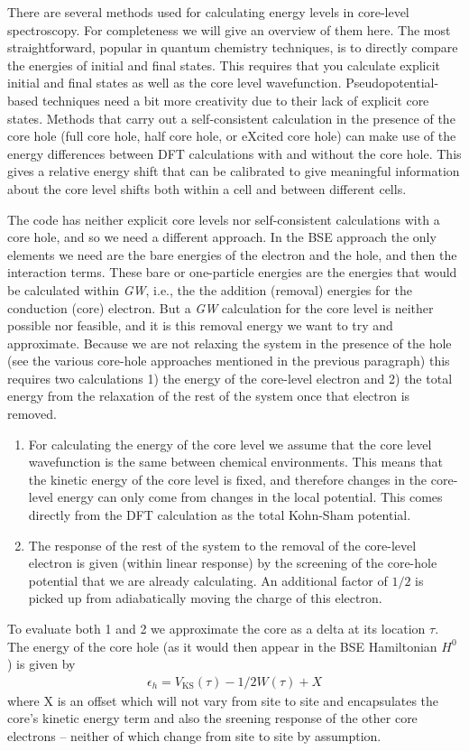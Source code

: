 \documentclass[11pt]{report}
\begin{document}
There are several methods used for calculating energy levels in core-level spectroscopy. For completeness we will give an overview of them here. The most straightforward, popular in quantum chemistry techniques, is to directly compare the energies of initial and final states. This requires that you calculate explicit initial and final states as well as the core level wavefunction. Pseudopotential-based techniques need a bit more creativity due to their lack of explicit core states. Methods that carry out a self-consistent calculation in the presence of the core hole (full core hole, half core hole, or eXcited core hole) can make use of the energy differences between DFT calculations with and without the core hole. This gives a relative energy shift that can be calibrated to give meaningful information about the core level shifts both within a cell and between different cells.\cite{NeedCites}

The  code has neither explicit core levels nor self-consistent calculations with a core hole, and so we need a different approach. In the BSE approach the only elements we need are the bare energies of the electron and the hole, and then the interaction terms. These bare or one-particle energies are the energies that would be calculated within {\it GW}, i.e., the the addition (removal) energies for the conduction (core) electron. But a {\it GW} calculation for the core level is neither possible nor feasible, and it is this removal energy we want to try and approximate. Because we are not relaxing the system in the presence of the hole (see the various core-hole approaches mentioned in the previous paragraph) this requires two calculations 1) the energy of the core-level electron and 2) the total energy from the relaxation of the rest of the system once that electron is removed. 

\begin{enumerate}
\item
For calculating the energy of the core level we assume that the core level wavefunction is the same between chemical environments. This means that the kinetic energy of the core level is fixed, and therefore changes in the core-level energy can only come from changes in the local potential. This comes directly from the DFT calculation as the total Kohn-Sham potential.
\item The response of the rest of the system to the removal of the core-level electron is given (within linear response) by the screening of the core-hole potential that we are already calculating. An additional factor of $1/2$ is picked up from adiabatically moving the charge of this electron. 
\end{enumerate}
To evaluate both 1 and 2 we approximate the core as a delta at its location $\tau$. 
The energy of the core hole (as it would then appear in the BSE Hamiltonian $H^0$) is given by
\begin{align}
\epsilon_h = V_\text{KS}(\tau) - 1/2 W(\tau) + X
\end{align}
where X is an offset which will not vary from site to site and encapsulates the core's kinetic energy term and also the sreening response of the other core electrons -- neither of which change from site to site by assumption.
\end{document}
